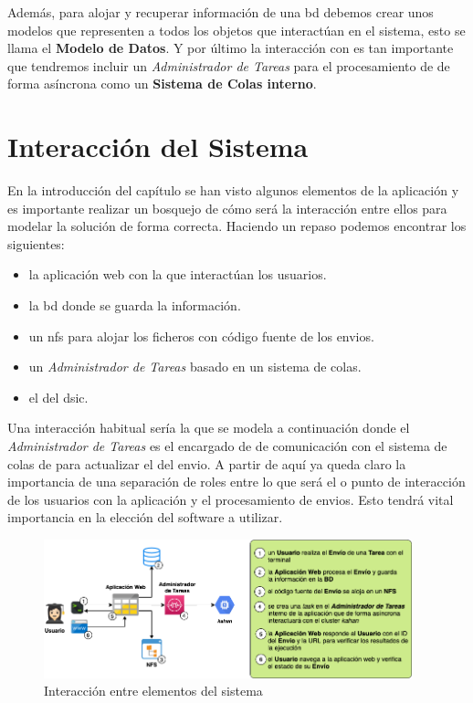 \documentclass[11pt,spanish,listoffigures,listoftables]{tfgetsinf}
\begin{document}
Además, para alojar y recuperar información de una \acrshort{bd} debemos crear unos modelos que representen a todos los objetos que interactúan en el sistema, esto se llama el \textbf{Modelo de Datos}. Y por último la interacción con \kahan es tan importante que tendremos incluir un \textit{Administrador de Tareas} para el procesamiento de  de forma asíncrona como un \textbf{Sistema de Colas interno}.

\section{Interacción del Sistema}

En la introducción del capítulo se han visto algunos elementos de la aplicación y es importante realizar un bosquejo de cómo será la interacción entre ellos para modelar la solución de forma correcta. Haciendo un repaso podemos encontrar los siguientes:

\begin{itemize}
	\item la aplicación web con la que interactúan los usuarios.
	\item la \acrfull{bd} donde se guarda la información.
	\item un \acrfull{nfs} para alojar los ficheros con código fuente de los \gls{envio}s.
	\item un \textit{Administrador de Tareas} basado en un sistema de colas.
	\item el  \kahan del \acrshort{dsic}.
\end{itemize} 

Una interacción habitual sería la que se modela a continuación donde el \textit{Administrador de Tareas} es el encargado de de comunicación con el sistema de colas de \kahan para actualizar el  del \gls{envio}. A partir de aquí ya queda claro la importancia de una separación de roles entre lo que será el  o punto de interacción de los usuarios con la aplicación y el procesamiento de \gls{envio}s. Esto tendrá vital importancia en la elección del software a utilizar.

\begin{figure}[!ht]
	\centering
	\includegraphics[width=0.95\textwidth]{img/modelado-interaccion}
	\caption[Modelado Interacción entre elementos del sistema]{Interacción entre elementos del sistema}
	\label{figura:modelado-interaccion}
\end{figure}
\end{document}
